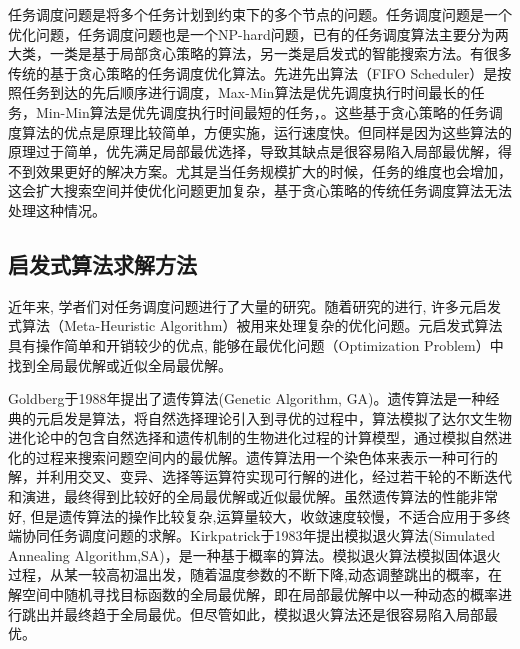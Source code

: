 任务调度问题是将多个任务计划到约束下的多个节点的问题。任务调度问题是一个优化问题，任务调度问题也是一个NP-hard问题\cite{tawfeek2013cloud}，已有的任务调度算法主要分为两大类，一类是基于局部贪心策略的算法，另一类是启发式的智能搜索方法。有很多传统的基于贪心策略的任务调度优化算法\cite{乔楠楠2017一种面向网络边缘任务调度问题的多方向粒子群优化算法}。先进先出算法（FIFO Scheduler）是按照任务到达的先后顺序进行调度\cite{zaharia2009job}，Max-Min算法是优先调度执行时间最长的任务，Min-Min算法是优先调度执行时间最短的任务，\cite{tabak2014improving,杜玉霞2010Min}。这些基于贪心策略的任务调度算法的优点是原理比较简单，方便实施，运行速度快。但同样是因为这些算法的原理过于简单，优先满足局部最优选择，导致其缺点是很容易陷入局部最优解，得不到效果更好的解决方案。尤其是当任务规模扩大的时候，任务的维度也会增加，这会扩大搜索空间并使优化问题更加复杂，基于贪心策略的传统任务调度算法无法处理这种情况。


\subsection{启发式算法求解方法}

近年来, 学者们对任务调度问题进行了大量的研究。随着研究的进行, 许多元启发式算法（Meta-Heuristic Algorithm）被用来处理复杂的优化问题。元启发式算法具有操作简单和开销较少的优点, 能够在最优化问题（Optimization Problem）中找到全局最优解或近似全局最优解。

Goldberg于1988年提出了遗传算法(Genetic Algorithm, GA)\cite{fonseca1995overview,whitley1994genetic,tanese1989distributed,Nagham2018}。遗传算法是一种经典的元启发是算法，将自然选择理论引入到寻优的过程中，算法模拟了达尔文生物进化论中的包含自然选择和遗传机制的生物进化过程的计算模型，通过模拟自然进化的过程来搜索问题空间内的最优解。遗传算法用一个染色体来表示一种可行的解，并利用交叉、变异、选择等运算符实现可行解的进化，经过若干轮的不断迭代和演进，最终得到比较好的全局最优解或近似最优解。虽然遗传算法的性能非常好, 但是遗传算法的操作比较复杂,运算量较大，收敛速度较慢，不适合应用于多终端协同任务调度问题的求解。Kirkpatrick于1983年提出模拟退火算法(Simulated Annealing Algorithm,SA)，是一种基于概率的算法。模拟退火算法模拟固体退火过程，从某一较高初温出发，随着温度参数的不断下降,动态调整跳出的概率，在解空间中随机寻找目标函数的全局最优解，即在局部最优解中以一种动态的概率进行跳出并最终趋于全局最优\cite{kirkpatrick1983optimization,Hong1991A,rutenbar1989simulated}。但尽管如此，模拟退火算法还是很容易陷入局部最优。

